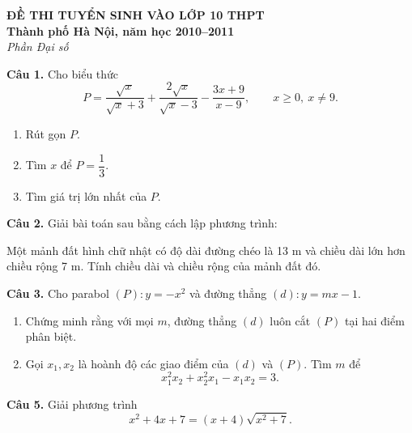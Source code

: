 \documentclass[12pt,a4paper]{article}
\begin{document}
\begin{center}
{\Large\bfseries ĐỀ THI TUYỂN SINH VÀO LỚP 10 THPT}\\
{\bfseries Thành phố Hà Nội, năm học 2010--2011}\\
{\itshape Phần Đại số}
\end{center}

\textbf{Câu 1.} Cho biểu thức
\[
P=\frac{\sqrt{x}}{\sqrt{x}+3}
+\frac{2\sqrt{x}}{\sqrt{x}-3}
-\frac{3x+9}{x-9},
\qquad x\ge0,\ x\ne9.
\]
\begin{enumerate}[label=\alph*)]
\item Rút gọn $P$.
\item Tìm $x$ để $P=\dfrac13$.
\item Tìm giá trị lớn nhất của $P$.
\end{enumerate}

\textbf{Câu 2.} Giải bài toán sau bằng cách lập phương trình:

Một mảnh đất hình chữ nhật có độ dài đường chéo là 13 m và chiều dài lớn hơn chiều rộng 7 m. Tính chiều dài và chiều rộng của mảnh đất đó.

\textbf{Câu 3.} Cho parabol $(P):y=-x^2$ và đường thẳng $(d):y=mx-1$.
\begin{enumerate}[label=\alph*)]
\item Chứng minh rằng với mọi $m$, đường thẳng $(d)$ luôn cắt $(P)$ tại hai điểm phân biệt.
\item Gọi $x_1,x_2$ là hoành độ các giao điểm của $(d)$ và $(P)$. Tìm $m$ để
\[
x_1^2x_2+x_2^2x_1-x_1x_2=3.
\]
\end{enumerate}

\textbf{Câu 5.} Giải phương trình
\[
x^2+4x+7=(x+4)\sqrt{x^2+7}.
\]
\end{document}
